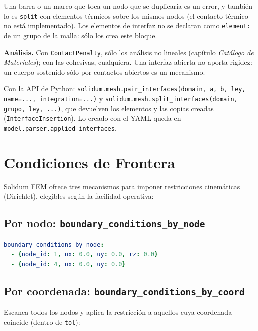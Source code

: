 \documentclass[11pt,oneside]{report}
\begin{document}
Una barra o un marco que toca un nodo que se duplicaría es un error, y también lo es \texttt{split} con elementos térmicos sobre los mismos nodos (el contacto térmico no está implementado). Los elementos de interfaz no se declaran como \texttt{element:} de un grupo de la malla: sólo los crea este bloque.

\textbf{Análisis.} Con \texttt{ContactPenalty}, sólo los análisis no lineales (capítulo \textit{Catálogo de Materiales}); con las cohesivas, cualquiera. Una interfaz abierta no aporta rigidez: un cuerpo sostenido sólo por contactos abiertos es un mecanismo.

Con la API de Python: \texttt{solidum.\allowbreak{}mesh.\allowbreak{}pair\_\allowbreak{}interfaces(domain, a, b, ley, name=.\allowbreak{}.\allowbreak{}.\allowbreak{}, integration=.\allowbreak{}.\allowbreak{}.\allowbreak{})} y \texttt{solidum.\allowbreak{}mesh.\allowbreak{}split\_\allowbreak{}interfaces(domain, grupo, ley, .\allowbreak{}.\allowbreak{}.\allowbreak{})}, que devuelven los elementos y las copias creadas (\texttt{InterfaceInsertion}). Lo creado con el YAML queda en \texttt{model.\allowbreak{}parser.\allowbreak{}applied\_\allowbreak{}interfaces}.

\section{Condiciones de Frontera}

Solidum FEM ofrece tres mecanismos para imponer restricciones cinemáticas (Dirichlet), elegibles según la facilidad operativa:

\subsection{Por nodo: \texttt{boundary\_\allowbreak{}conditions\_\allowbreak{}by\_\allowbreak{}node}}

\begin{lstlisting}[language=yaml]
boundary_conditions_by_node:
  - {node_id: 1, ux: 0.0, uy: 0.0, rz: 0.0}
  - {node_id: 4, ux: 0.0, uy: 0.0}

\end{lstlisting}

\subsection{Por coordenada: \texttt{boundary\_\allowbreak{}conditions\_\allowbreak{}by\_\allowbreak{}coord}}

Escanea todos los nodos y aplica la restricción a aquellos cuya coordenada coincide (dentro de \texttt{tol}):
\end{document}
